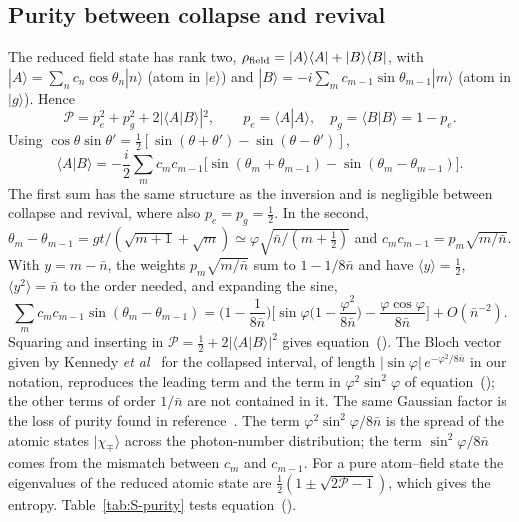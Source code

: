 \documentclass{iopjournal}
\newcommand{\nbar}{\bar{n}}
\newcommand{\ket}[1]{|#1\rangle}
\newcommand{\bra}[1]{\langle #1|}
\newcommand{\braket}[2]{\langle #1|#2\rangle}
\begin{document}
\subsection{Purity between collapse and revival}
The reduced field state has rank two, $\rho_{\rm field} = \ket{A}\bra{A}+\ket{B}\bra{B}$, with $\ket{A} = \sum_n c_n\cos\theta_n\ket{n}$ (atom in $\ket{e}$) and $\ket{B} = -i\sum_m c_{m-1}\sin\theta_{m-1}\ket{m}$ (atom in $\ket{g}$). Hence
\begin{equation}
\mathcal{P} = p_e^2+p_g^2+2|\braket{A}{B}|^2,\qquad p_e = \braket{A}{A},\quad p_g = \braket{B}{B} = 1-p_e.
\end{equation}
Using $\cos\theta\sin\theta' = \tfrac12[\sin(\theta+\theta')-\sin(\theta-\theta')]$,
\begin{equation}
\braket{A}{B} = -\frac{i}{2}\sum_m c_mc_{m-1}\big[\sin(\theta_m+\theta_{m-1}) - \sin(\theta_m-\theta_{m-1})\big].
\end{equation}
The first sum has the same structure as the inversion and is negligible between collapse and revival, where also $p_e = p_g = \tfrac12$. In the second, $\theta_m-\theta_{m-1} = gt/(\sqrt{m+1}+\sqrt m) \simeq \varphi\sqrt{\nbar/(m+\tfrac12)}$ and $c_mc_{m-1} = p_m\sqrt{m/\nbar}$. With $y = m-\nbar$, the weights $p_m\sqrt{m/\nbar}$ sum to $1-1/8\nbar$ and have $\langle y\rangle = \tfrac12$, $\langle y^2\rangle = \nbar$ to the order needed, and expanding the sine,
\begin{equation}
\sum_m c_mc_{m-1}\sin(\theta_m-\theta_{m-1}) = \Big(1-\frac{1}{8\nbar}\Big)\Big[\sin\varphi\Big(1-\frac{\varphi^2}{8\nbar}\Big) - \frac{\varphi\cos\varphi}{8\nbar}\Big] + O(\nbar^{-2}).
\end{equation}
Squaring and inserting in $\mathcal{P} = \tfrac12+2|\braket{A}{B}|^2$ gives equation~(). The Bloch vector given by Kennedy \textit{et al}~\cite{S-kennedy2010} for the collapsed interval, of length $|\sin\varphi|\,e^{-\varphi^2/8\nbar}$ in our notation, reproduces the leading term and the term in $\varphi^2\sin^2\varphi$ of equation~(); the other terms of order $1/\nbar$ are not contained in it. The same Gaussian factor is the loss of purity found in reference~\cite{S-gea1992}. The term $\varphi^2\sin^2\varphi/8\nbar$ is the spread of the atomic states $\ket{\chi_\mp}$ across the photon-number distribution; the term $\sin^2\varphi/8\nbar$ comes from the mismatch between $c_m$ and $c_{m-1}$. For a pure atom--field state the eigenvalues of the reduced atomic state are $\tfrac12(1\pm\sqrt{2\mathcal{P}-1})$, which gives the entropy. Table~\ref{tab:S-purity} tests equation~().
\end{document}
